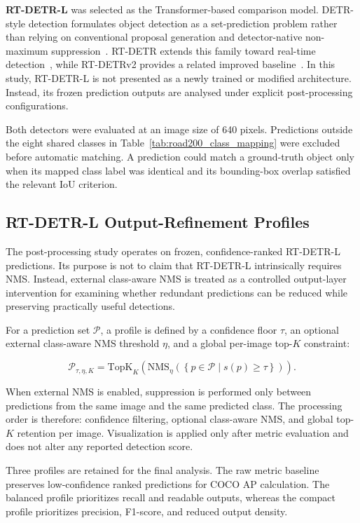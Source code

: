 \documentclass[runningheads]{llncs}
\begin{document}
\textbf{RT-DETR-L} was selected as the Transformer-based comparison model. DETR-style detection formulates object detection as a set-prediction problem rather than relying on conventional proposal generation and detector-native non-maximum suppression~\cite{carion2020detr}. RT-DETR extends this family toward real-time detection~\cite{zhao2024detrsbeat}, while RT-DETRv2 provides a related improved baseline~\cite{lv2024rtdetrv2}. In this study, RT-DETR-L is not presented as a newly trained or modified architecture. Instead, its frozen prediction outputs are analysed under explicit post-processing configurations.

Both detectors were evaluated at an image size of 640 pixels. Predictions outside the eight shared classes in Table~\ref{tab:road200_class_mapping} were excluded before automatic matching. A prediction could match a ground-truth object only when its mapped class label was identical and its bounding-box overlap satisfied the relevant IoU criterion.

\subsection{RT-DETR-L Output-Refinement Profiles}

The post-processing study operates on frozen, confidence-ranked RT-DETR-L predictions. Its purpose is not to claim that RT-DETR-L intrinsically requires NMS. Instead, external class-aware NMS is treated as a controlled output-layer intervention for examining whether redundant predictions can be reduced while preserving practically useful detections.

For a prediction set $\mathcal{P}$, a profile is defined by a confidence floor $\tau$, an optional external class-aware NMS threshold $\eta$, and a global per-image top-$K$ constraint:

\[
\mathcal{P}_{\tau,\eta,K}
=
\mathrm{TopK}_{K}
\left(
\mathrm{NMS}_{\eta}
\left(
\left\{
p \in \mathcal{P}
\mid
s(p) \geq \tau
\right\}
\right)
\right).
\]

When external NMS is enabled, suppression is performed only between predictions from the same image and the same predicted class. The processing order is therefore: confidence filtering, optional class-aware NMS, and global top-$K$ retention per image. Visualization is applied only after metric evaluation and does not alter any reported detection score.

Three profiles are retained for the final analysis. The raw metric baseline preserves low-confidence ranked predictions for COCO AP calculation. The balanced profile prioritizes recall and readable outputs, whereas the compact profile prioritizes precision, F1-score, and reduced output density.
\end{document}
